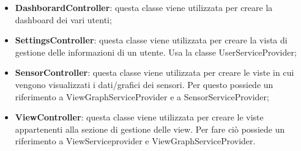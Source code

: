 \begin{itemize}
\begin{itemize}
			\item \textbf{DashborardController}: questa classe viene utilizzata per creare la dashboard dei vari utenti;
			\item \textbf{SettingsController}: questa classe viene utilizzata per creare la vista di gestione delle informazioni di un utente. Usa la classe UserServiceProvider;  
			\item \textbf{SensorController}: questa classe viene utilizzata per creare le viste in cui vengono visualizzati i dati/grafici dei sensori. Per questo possiede un riferimento a ViewGraphServiceProvider e a SensorServiceProvider;
			\item \textbf{ViewController}: questa classe viene utilizzata per creare le viste appartenenti alla sezione di gestione delle view. Per fare ciò possiede un riferimento a ViewServiceprovider e ViewGraphServiceProvider. 
		\end{itemize}
		
		
	\end{itemize}
